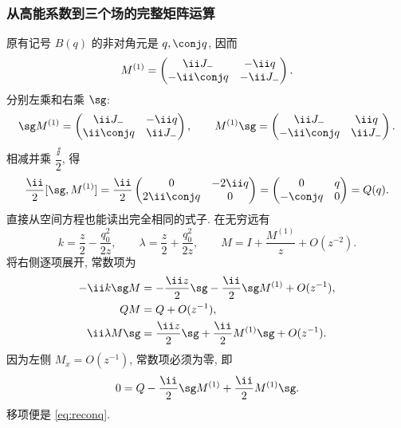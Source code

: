 \subsubsection*{从高能系数到三个场的完整矩阵运算}
原有记号 $B(q)$ 的非对角元是 $q,\conj q$, 因而
\[
M^{(1)}=
\begin{pmatrix}
\ii J_-&-\ii q\\
-\ii\conj q&-\ii J_-
\end{pmatrix}.
\]
分别左乘和右乘 $\sg$:
\[
\sg M^{(1)}=
\begin{pmatrix}
\ii J_-&-\ii q\\
\ii\conj q&\ii J_-
\end{pmatrix},\qquad
M^{(1)}\sg=
\begin{pmatrix}
\ii J_-&\ii q\\
-\ii\conj q&\ii J_-
\end{pmatrix}.
\]
相减并乘 $\dfrac{\ii}{2}$, 得
\[
\dfrac{\ii}{2}[\sg,M^{(1)}]
=\dfrac{\ii}{2}
\begin{pmatrix}
0&-2\ii q\\
2\ii\conj q&0
\end{pmatrix}
=\begin{pmatrix}
0&q\\-\conj q&0
\end{pmatrix}=Q(q).
\]
直接从空间方程也能读出完全相同的式子.
在无穷远有
\[
k=\dfrac{z}{2}-\dfrac{q_0^2}{2z},\qquad
\lambda=\dfrac{z}{2}+\dfrac{q_0^2}{2z},\qquad
M=I+\dfrac{M^{(1)}}{z}+O(z^{-2}).
\]
将右侧逐项展开, 常数项为
\[
\begin{aligned}
-\ii k\sg M
&=-\dfrac{\ii z}{2}\sg
-\dfrac{\ii}{2}\sg M^{(1)}+O(z^{-1}),\\
QM&=Q+O(z^{-1}),\\
\ii\lambda M\sg
&=\dfrac{\ii z}{2}\sg
+\dfrac{\ii}{2}M^{(1)}\sg+O(z^{-1}).
\end{aligned}
\]
因为左侧 $M_x=O(z^{-1})$, 常数项必须为零, 即
\[
0=Q-\dfrac{\ii}{2}\sg M^{(1)}
+\dfrac{\ii}{2}M^{(1)}\sg.
\]
移项便是 \eqref{eq:reconq}.

